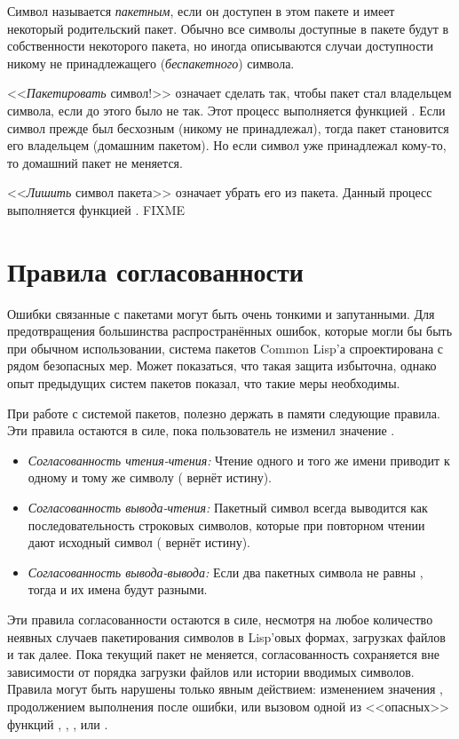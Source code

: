 Символ называется \emph{пакетным}, если он доступен в этом
пакете и имеет некоторый родительский пакет. Обычно все символы
доступные в пакете будут в собственности некоторого пакета, но иногда
описываются случаи доступности никому не принадлежащего (\emph{беспакетного})
символа.

<<\emph{Пакетировать} символ!>> означает сделать так, чтобы
пакет стал владельцем символа, если до этого было не так.
Этот процесс выполняется функцией .
Если символ прежде был бесхозным (никому не принадлежал), тогда пакет становится
его владельцем (домашним пакетом). Но если символ уже принадлежал кому-то, то
домашний пакет не меняется.

<<\emph{Лишить} символ пакета>> означает убрать его из пакета. Данный
процесс выполняется функцией . FIXME

\section{Правила согласованности}

Ошибки связанные с пакетами могут быть очень тонкими и
запутанными. Для предотвращения большинства распространённых ошибок,
которые могли бы быть при обычном использовании, система пакетов
Common Lisp'а спроектирована с рядом безопасных мер. Может показаться,
что такая защита избыточна, однако опыт предыдущих систем пакетов
показал, что такие меры необходимы.

При работе с системой пакетов, полезно держать в памяти следующие правила.
Эти правила остаются в силе, пока пользователь не изменил значение .

\begin{itemize}
\item \emph{Согласованность чтения-чтения:} Чтение одного и того же
  имени приводит к одному и тому же символу ( вернёт истину).

\item \emph{Согласованность вывода-чтения:} Пакетный символ
  всегда выводится как последовательность строковых символов, которые
  при повторном чтении дают исходный символ ( вернёт истину).

\item \emph{Согласованность вывода-вывода:} Если два пакетных
  символа не равны , тогда и их имена будут разными.
\end{itemize}

Эти правила согласованности остаются в силе, несмотря на любое
количество неявных случаев пакетирования символов в Lisp'овых формах,
загрузках файлов и так далее. Пока текущий пакет не меняется,
согласованность сохраняется вне зависимости от порядка загрузки файлов
или истории вводимых символов. Правила могут быть нарушены только
явным действием: изменением значения , продолжением
выполнения после ошибки, или вызовом одной из <<опасных>> функций
, , , 
или .

